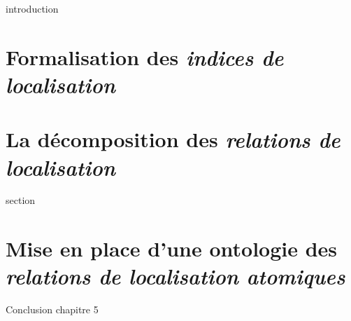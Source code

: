 %

\chaptertoc{}

\label{sec:5-int}
{introduction}

\section{Formalisation des \emph{indices de localisation}}
\label{sec:5-1}

\section{La décomposition des \emph{relations de localisation}}
\label{sec:5-2}
{section}

\section{Mise en place d'une ontologie des \emph{relations de localisation atomiques}}
\label{sec:5-3}

\label{sec:5-cnc}

Conclusion chapitre 5
